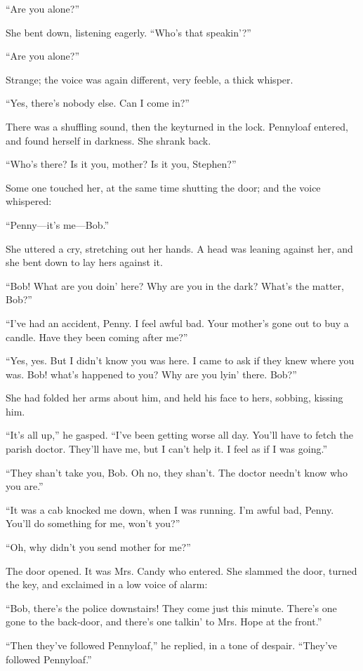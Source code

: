 ``Are you alone?''

She bent down, listening eagerly. ``Who's that speakin'?''

``Are you alone?''

Strange; the voice was again different, very feeble, a thick whisper.

{}``Yes, there's nobody else. Can I come in?''

There was a shuffling sound, then the keyturned in the lock. Pennyloaf
entered, and found herself in darkness. She shrank back.

``Who's there? Is it you, mother? Is it you, Stephen?''

Some one touched her, at the same time shutting the door; and the voice
whispered:

``Penny---it's me---Bob.''

She uttered a cry, stretching out her hands. A head was leaning against
her, and she bent down to lay hers against it.

``Bob! What are you doin' here? Why are you in the dark? What's the
matter, Bob?''

``I've had an accident, Penny. I feel awful bad. Your mother's gone out
to buy a candle. Have they been coming after me?''

``Yes, yes. But I didn't know you was here. I came to ask if they knew
where you was. Bob! what's happened to you? Why are you lyin' there.
Bob?''

She had folded her arms about him, and held his face to hers, sobbing,
kissing him.

``It's all up,'' he gasped. ``I've been getting worse all day. You'll
have to fetch the parish {}doctor. They'll have me, but I can't help it.
I feel as if I was going.''

``They shan't take you, Bob. Oh no, they shan't. The doctor needn't know
who you are.''

``It was a cab knocked me down, when I was running. I'm awful bad,
Penny. You'll do something for me, won't you?''

``Oh, why didn't you send mother for me?''

The door opened. It was Mrs. Candy who entered. She slammed the door,
turned the key, and exclaimed in a low voice of alarm:

``Bob, there's the police downstairs! They come just this minute.
There's one gone to the back-door, and there's one talkin' to Mrs. Hope
at the front.''

``Then they've followed Pennyloaf,'' he replied, in a tone of despair.
``They've followed Pennyloaf.''

